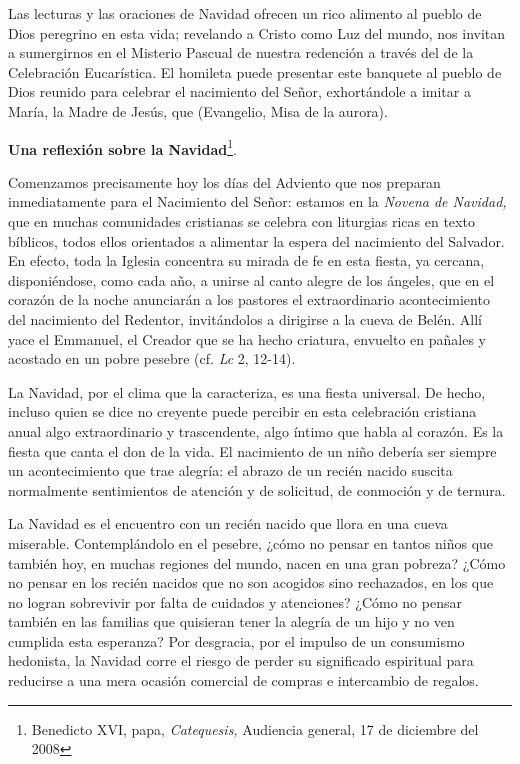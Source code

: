 Las lecturas y las oraciones de Navidad ofrecen un rico alimento al pueblo de Dios peregrino en esta vida; revelando a Cristo como Luz del mundo, nos invitan a sumergirnos en el Misterio Pascual de nuestra redención a través del  de la Celebración Eucarística. El homileta puede presentar este banquete al pueblo de Dios reunido para celebrar el nacimiento del Señor, exhortándole a imitar a María, la Madre de Jesús, que  (Evangelio, Misa de la aurora).

\textbf{Una reflexión sobre la Navidad}\footnote{Benedicto XVI, papa, \emph{Catequesis,} Audiencia general, 17 de diciembre del 2008}.

Comenzamos precisamente hoy los días del Adviento que nos preparan inmediatamente para el Nacimiento del Señor: estamos en la \emph{Novena de Navidad,} que en muchas comunidades cristianas se celebra con liturgias ricas en texto bíblicos, todos ellos orientados a alimentar la espera del nacimiento del Salvador. En efecto, toda la Iglesia concentra su mirada de fe en esta fiesta, ya cercana, disponiéndose, como cada año, a unirse al canto alegre de los ángeles, que en el corazón de la noche anunciarán a los pastores el extraordinario acontecimiento del nacimiento del Redentor, invitándolos a dirigirse a la cueva de Belén. Allí yace el Emmanuel, el Creador que se ha hecho criatura, envuelto en pañales y acostado en un pobre pesebre (cf. \emph{Lc} 2, 12-14).

La Navidad, por el clima que la caracteriza, es una fiesta universal. De hecho, incluso quien se dice no creyente puede percibir en esta celebración cristiana anual algo extraordinario y trascendente, algo íntimo que habla al corazón. Es la fiesta que canta el don de la vida. El nacimiento de un niño debería ser siempre un acontecimiento que trae alegría: el abrazo de un recién nacido suscita normalmente sentimientos de atención y de solicitud, de conmoción y de ternura.

La Navidad es el encuentro con un recién nacido que llora en una cueva miserable. Contemplándolo en el pesebre, ¿cómo no pensar en tantos niños que también hoy, en muchas regiones del mundo, nacen en una gran pobreza? ¿Cómo no pensar en los recién nacidos que no son acogidos sino rechazados, en los que no logran sobrevivir por falta de cuidados y atenciones? ¿Cómo no pensar también en las familias que quisieran tener la alegría de un hijo y no ven cumplida esta esperanza? Por desgracia, por el impulso de un consumismo hedonista, la Navidad corre el riesgo de perder su significado espiritual para reducirse a una mera ocasión comercial de compras e intercambio de regalos.

